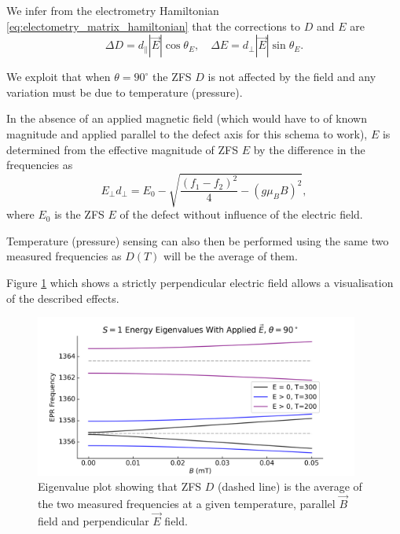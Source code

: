 We infer from the electrometry Hamiltonian \eqref{eq:electometry_matrix_hamiltonian} that the corrections to $D$ and $E$ are 
\begin{equation}
    \Delta D = d_\parallel |\vec{E}| \cos\theta_E, \quad \Delta E = d_\perp |\vec{E}| \sin \theta_E.
    \label{eq:}
\end{equation}

We exploit that when $\theta = 90^\circ$ the ZFS $D$ is not affected by the field and any variation must be due to temperature (pressure). 

In the absence of an applied magnetic field (which would have to of known magnitude and applied parallel to the defect axis for this schema to work), $E$ is determined from the effective magnitude of ZFS $E$ by the difference in the frequencies as
\begin{equation}
    E_\perp d_\perp = E_0 - \sqrt{\frac{(f_1 - f_2)^2}{4} - (g \mu_B B)^2}, 
    \label{eq:multi-E+T}
\end{equation}
where $E_0$ is the ZFS $E$ of the defect without influence of the electric field. 

Temperature (pressure) sensing can also then be performed using the same two measured frequencies as $D(T)$ will be the average of them. 

Figure \ref{fig:E_Field_perp_temp} which shows a strictly perpendicular electric field allows a visualisation of the described effects.  
\begin{figure}[H]
    \begin{center}
        \includegraphics[width=0.95\textwidth]{figures/EFieldPerpTemp.png}
    \end{center}
    \caption{Eigenvalue plot showing that ZFS $D$ (dashed line) is the average of the two measured frequencies at a given temperature, parallel $\vec{B}$ field and perpendicular $\vec{E}$ field.}\label{fig:E_Field_perp_temp}
\end{figure}

